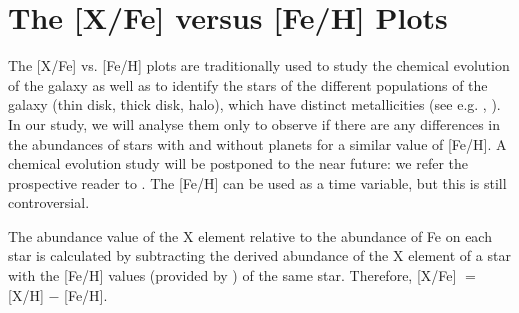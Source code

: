 \documentclass[dvips,12pt,a4paper]{report}
\begin{document}
{{\section {The [X/Fe] versus [Fe/H] Plots}
\label{xfefeh}
The [X/Fe] vs. [Fe/H] plots are traditionally used to study the chemical evolution of the galaxy as well as to identify the stars of the different populations of the galaxy (thin disk, thick disk, halo), which have distinct metallicities (see e.g. \citeauthor{Bensby-2003} \citeyear{Bensby-2003}, \citeauthor{Fuhrmann-2004} \citeyear{Fuhrmann-2004}). In our study, we will analyse them only to observe if there are any differences in the abundances of stars with and without planets for a similar value of [Fe/H]. A chemical evolution study will be postponed to the near future: we refer the prospective reader to \citet{McWilliam-1997}. The [Fe/H] can be used as a time variable, but this is still controversial. 

The abundance value of the X element relative to the abundance of Fe on each star is calculated by subtracting the derived abundance of the X element of a star with the [Fe/H] values (provided by \citeauthor{Sousa-2008} \citeyear{Sousa-2008}) of the same star. Therefore, [X/Fe] $=$ [X/H] $-$ [Fe/H].

}}
\end{document}
